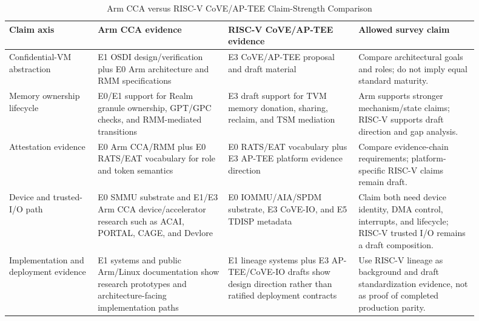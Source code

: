 \begin{table}[t]
\centering
\scriptsize
\caption{Arm CCA versus RISC-V CoVE/AP-TEE Claim-Strength Comparison}
\label{tab:cca_cove_claim_strength}
\begin{tabular}{@{}p{0.17\linewidth}p{0.25\linewidth}p{0.25\linewidth}p{0.23\linewidth}@{}}
\toprule
\textbf{Claim axis} & \textbf{Arm CCA evidence} & \textbf{RISC-V CoVE/AP-TEE evidence} & \textbf{Allowed survey claim} \\ \midrule
Confidential-VM abstraction & E1 OSDI design/verification plus E0 Arm architecture and RMM specifications~\cite{li2022cca,arm_cca_spec,arm_rmm_spec} & E3 CoVE/AP-TEE proposal and draft material~\cite{sahita2023cove,riscv_ap_tee_2024} & Compare architectural goals and roles; do not imply equal standard maturity. \\
Memory ownership lifecycle & E0/E1 support for Realm granule ownership, GPT/GPC checks, and RMM-mediated transitions~\cite{li2022cca,arm_cca_spec,arm_rme_spec} & E3 draft support for TVM memory donation, sharing, reclaim, and TSM mediation~\cite{riscv_ap_tee_2024} & Arm supports stronger mechanism/state claims; RISC-V supports draft direction and gap analysis. \\
Attestation evidence & E0 Arm CCA/RMM plus E0 RATS/EAT vocabulary for role and token semantics~\cite{arm_cca_spec,arm_rmm_spec,rats_rfc,eat_rfc} & E0 RATS/EAT vocabulary plus E3 AP-TEE platform evidence direction~\cite{rats_rfc,eat_rfc,riscv_ap_tee_2024} & Compare evidence-chain requirements; platform-specific RISC-V claims remain draft. \\
Device and trusted-I/O path & E0 SMMU substrate and E1/E3 Arm CCA device/accelerator research such as ACAI, PORTAL, CAGE, and Devlore~\cite{arm_smmu_spec,acai2023,sang2025portal,wang2026cage,bertschi2026devlore} & E0 IOMMU/AIA/SPDM substrate, E3 CoVE-IO, and E5 TDISP metadata~\cite{riscv_iommu_2023,riscv_aia_2023,dmtf_spdm_2025,riscv_cove_io_2026,pcisig_tdisp_2022} & Claim both need device identity, DMA control, interrupts, and lifecycle; RISC-V trusted I/O remains a draft composition. \\
Implementation and deployment evidence & E1 systems and public Arm/Linux documentation show research prototypes and architecture-facing implementation paths~\cite{li2022cca,linux_arm_cca_doc,bertschi2025opencca} & E1 lineage systems plus E3 AP-TEE/CoVE-IO drafts show design direction rather than ratified deployment contracts~\cite{costan2016sanctum,lee2020keystone,riscv_ap_tee_2024,riscv_cove_io_2026} & Use RISC-V lineage as background and draft standardization evidence, not as proof of completed production parity. \\ \bottomrule
\end{tabular}
\end{table}

